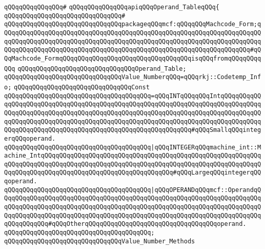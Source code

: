 \verb|qQQqqQQqqQQqqQQq#|\newline
\verb|qQQqqQQqqQQqqQQqapiqQQqOperand_TableqQQq{|\newline
\verb|qQQqqQQqqQQqqQQqqQQqqQQqqQQqqQQq#|\newline
\verb|qQQqqQQqqQQqqQQqqQQqqQQqqQQqqQQqpackageqQQqmcf:qQQqqQQqMachcode_Form;qQQqqQQqqQQqqQQqqQQqqQQqqQQqqQQqqQQqqQQqqQQqqQQqqQQqqQQqqQQqqQQqqQQqqQQqqQQqqQQqqQQqqQQqqQQqqQQqqQQqqQQqqQQqqQQqqQQqqQQqqQQqqQQqqQQqqQQqqQQqqQQqqQQqqQQqqQQqqQQqqQQqqQQqqQQqqQQqqQQqqQQqqQQqqQQqqQQqqQQqqQQqqQQq#qQQqMachcode_FormqQQqqQQqqQQqqQQqqQQqqQQqqQQqqQQqqQQqisqQQqfromqQQqqQQqqQQq|\newline
\newline
\verb|qQQqqQQqqQQqqQQqqQQqqQQqqQQqqQQqOperand_Table;|\newline
\newline
\verb|qQQqqQQqqQQqqQQqqQQqqQQqqQQqqQQqValue_NumberqQQq=qQQqrkj::Codetemp_Info;|\newline
\newline
\verb|qQQqqQQqqQQqqQQqqQQqqQQqqQQqqQQqConst|\newline
\verb|qQQqqQQqqQQqqQQqqQQqqQQqqQQqqQQqqQQqqQQq=qQQqINTqQQqqQQqIntqQQqqQQqqQQqqQQqqQQqqQQqqQQqqQQqqQQqqQQqqQQqqQQqqQQqqQQqqQQqqQQqqQQqqQQqqQQqqQQqqQQqqQQqqQQqqQQqqQQqqQQqqQQqqQQqqQQqqQQqqQQqqQQqqQQqqQQqqQQqqQQqqQQqqQQqqQQqqQQqqQQqqQQqqQQqqQQqqQQqqQQqqQQqqQQqqQQqqQQqqQQqqQQqqQQqqQQqqQQqqQQqqQQqqQQqqQQqqQQqqQQqqQQqqQQqqQQqqQQqqQQqqQQqqQQq#qQQqSmallqQQqintegerqQQqoperand.|\newline
\verb|qQQqqQQqqQQqqQQqqQQqqQQqqQQqqQQqqQQqqQQq|\verb#|qQQqINTEGERqQQqmachine_int::Machine_IntqQQqqQQqqQQqqQQqqQQqqQQqqQQqqQQqqQQqqQQqqQQqqQQqqQQqqQQqqQQqqQQqqQQqqQQqqQQqqQQqqQQqqQQqqQQqqQQqqQQqqQQqqQQqqQQqqQQqqQQqqQQqqQQqqQQqqQQqqQQqqQQqqQQqqQQqqQQqqQQqqQQqqQQqqQQqqQQq#\verb|#qQQqLargeqQQqintegerqQQqoperand.|\newline
\verb|qQQqqQQqqQQqqQQqqQQqqQQqqQQqqQQqqQQqqQQq|\verb#|qQQqOPERANDqQQqmcf::OperandqQQqqQQqqQQqqQQqqQQqqQQqqQQqqQQqqQQqqQQqqQQqqQQqqQQqqQQqqQQqqQQqqQQqqQQqqQQqqQQqqQQqqQQqqQQqqQQqqQQqqQQqqQQqqQQqqQQqqQQqqQQqqQQqqQQqqQQqqQQqqQQqqQQqqQQqqQQqqQQqqQQqqQQqqQQqqQQqqQQqqQQqqQQqqQQqqQQqqQQqqQQqqQQqqQQqqQQqqQQqqQQq#\verb|#qQQqOtherqQQqqQQqqQQqqQQqqQQqqQQqqQQqqQQqqQQqoperand.|\newline
\verb|qQQqqQQqqQQqqQQqqQQqqQQqqQQqqQQqqQQqqQQq;|\newline
\newline
\verb|qQQqqQQqqQQqqQQqqQQqqQQqqQQqqQQqValue_Number_Methods|\newline
